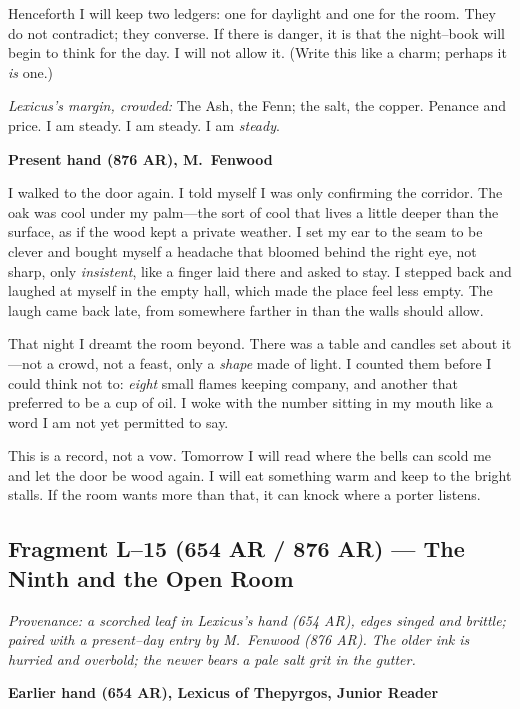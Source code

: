 \documentclass[11pt]{article}
\numberwithin{equation}{section} %
\theoremstyle{plain} %
\theoremstyle{definition} %
\theoremstyle{remark} %
\begin{document}
Henceforth I will keep two ledgers: one for daylight and one for the room. They do not contradict; they converse. If there is danger, it is that the night–book will begin to think for the day. I will not allow it. (Write this like a charm; perhaps it \emph{is} one.)

\medskip
\noindent\textit{Lexicus’s margin, crowded:} The Ash, the Fenn; the salt, the copper. Penance and price. I am steady. I am steady. I am \emph{steady}.

\medskip
\noindent\textbf{Present hand (876 AR), M.\ Fenwood}

I walked to the door again. I told myself I was only confirming the corridor. The oak was cool under my palm—the sort of cool that lives a little deeper than the surface, as if the wood kept a private weather. I set my ear to the seam to be clever and bought myself a headache that bloomed behind the right eye, not sharp, only \emph{insistent}, like a finger laid there and asked to stay. I stepped back and laughed at myself in the empty hall, which made the place feel less empty. The laugh came back late, from somewhere farther in than the walls should allow.

That night I dreamt the room beyond. There was a table and candles set about it—not a crowd, not a feast, only a \emph{shape} made of light. I counted them before I could think not to: \emph{eight} small flames keeping company, and another that preferred to be a cup of oil. I woke with the number sitting in my mouth like a word I am not yet permitted to say.

This is a record, not a vow. Tomorrow I will read where the bells can scold me and let the door be wood again. I will eat something warm and keep to the bright stalls. If the room wants more than that, it can knock where a porter listens.

\subsection{Fragment L--15 (654 AR / 876 AR) — The Ninth and the Open Room}
\label{frag:l15}

\noindent\textit{Provenance: a scorched leaf in Lexicus’s hand (654 AR), edges singed and brittle; paired with a present–day entry by M.\ Fenwood (876 AR). The older ink is hurried and overbold; the newer bears a pale salt grit in the gutter.}

\medskip
\noindent\textbf{Earlier hand (654 AR), Lexicus of Thepyrgos, Junior Reader}
\end{document}
